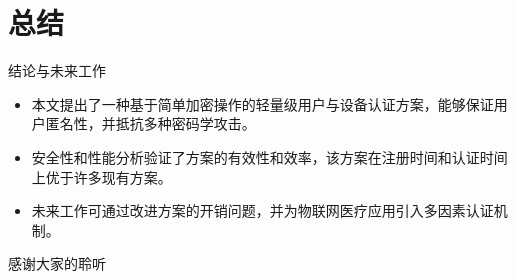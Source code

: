\documentclass{beamer}
\begin{document}
\section{总结}
\begin{frame}{结论与未来工作}
    \begin{itemize}
        \item 本文提出了一种基于简单加密操作的轻量级用户与设备认证方案，能够保证用户匿名性，并抵抗多种密码学攻击。
        \item 安全性和性能分析验证了方案的有效性和效率，该方案在注册时间和认证时间上优于许多现有方案。
        \item 未来工作可通过改进方案的开销问题，并为物联网医疗应用引入多因素认证机制。
    \end{itemize}
\end{frame}
















\begin{frame}
    \begin{center}
        {\Huge\calligra 感谢大家的聆听}
    \end{center}
\end{frame}
\end{document}
